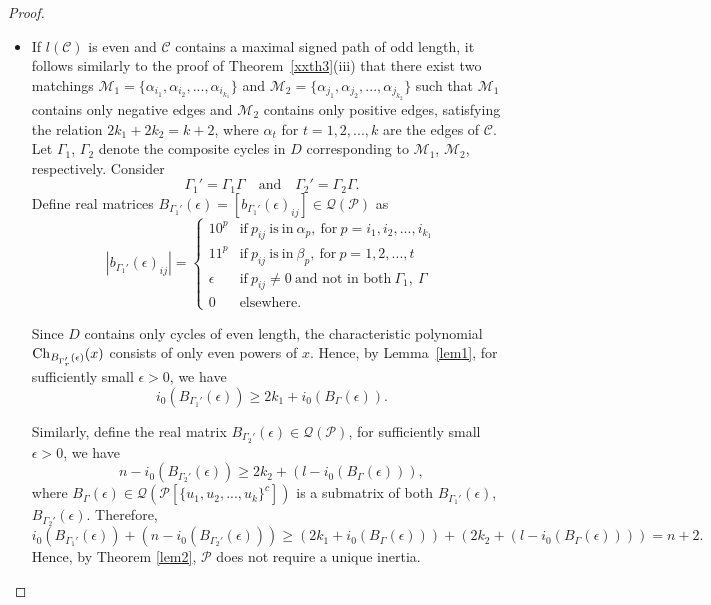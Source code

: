 \documentclass[a4paper, 10pt]{article}
\numberwithin{equation}{section}
\def\Ch{{\rm Ch}}
\begin{document}
\begin{proof}
\begin{itemize}
		
		
		\item[iii.] If $l(\mathcal{C})$ is even and $\mathcal{C}$ contains a maximal signed path of odd length, it follows similarly to the proof of Theorem~\ref{xxth3}(iii) that there exist two matchings $\mathcal{M}_1=\{\alpha_{i_1},\alpha_{i_2},..., \alpha_{i_{k_1}}\}$ and $\mathcal{M}_2=\{\alpha_{j_1},\alpha_{j_2},..., \alpha_{j_{k_2}}\}$ such that $\mathcal{M}_1$ contains only negative edges and $\mathcal{M}_2$ contains only positive edges, satisfying the relation $2k_1 + 2k_2 = k + 2$, where $\alpha_t$ for $t=1,2,...,k$ are the edges of $\mathcal{C}$. Let $\Gamma_1$, $\Gamma_2$ denote the composite cycles in $D$ corresponding to $\mathcal{M}_1$, $\mathcal{M}_2$, respectively. Consider
		$$\Gamma_1'=\Gamma_1\Gamma\quad\text{and}\quad\Gamma_2'=\Gamma_2\Gamma.$$ Define real matrices $B_{\Gamma_1'}(\epsilon)=[b_{\Gamma_1'}(\epsilon)_{ij}]\in \mathcal{Q}(\mathcal{P})$ as
		$$|b_{\Gamma_1'}(\epsilon)_{ij}|= \begin{cases}
			10^p & \text{if}\ p_{ij}~ \text{is}~ \text{in}~ \alpha_p,~\text{for}~p=i_1,i_2,...,i_{k_1} \\
			11^p & \text{if}\ p_{ij}~ \text{is}~ \text{in}~ \beta_p,~\text{for}~p=1,2,...,t \\
			\epsilon & \text{if}~ p_{ij}\neq 0~\text{and not in both}~ \Gamma_1,~ \Gamma\\
			0 & \text{elsewhere.}
		\end{cases}$$
		
		Since $D$ contains only cycles of even length, the characteristic polynomial $\Ch_{B_{\Gamma_r'}(\epsilon)}(x)$ consists of only even powers of $x$. Hence, by Lemma~\ref{lem1}, for sufficiently small $\epsilon > 0$, we have $$i_0(B_{\Gamma_1'}(\epsilon))\geq 2k_1+i_0(B_{\Gamma}(\epsilon)).$$ 
		
		
		Similarly, define the real matrix $B_{\Gamma_2'} (\epsilon)\in \mathcal{Q}(\mathcal{P})$, for sufficiently small $\epsilon > 0$, we have $$n-i_0(B_{\Gamma_2'}(\epsilon))\geq 2k_2+(l-i_0(B_{\Gamma}(\epsilon))),$$
		where $B_{\Gamma}(\epsilon)\in \mathcal{Q}(\mathcal{P}[\{u_1,u_2,...,u_k\}^c])$ is a submatrix of both $B_{\Gamma_1'}(\epsilon)$, $B_{\Gamma_2'}(\epsilon)$.
		Therefore,
		$$i_0(B_{\Gamma_1'}(\epsilon))+(n-i_0(B_{\Gamma_2'}(\epsilon)))\geq (2k_1+i_0(B_{\Gamma}(\epsilon)))+(2k_2+(l-i_0(B_{\Gamma}(\epsilon))))= n+2.$$ Hence, by Theorem \ref{lem2}, $\mathcal{P}$ does not require a unique inertia.  \end{itemize}
\end{proof}
\end{document}
